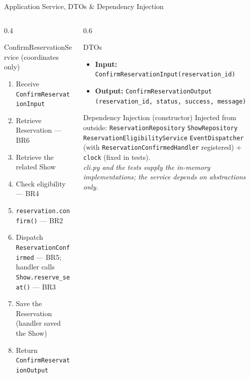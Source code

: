 \documentclass[aspectratio=169,11pt]{beamer}
\newcommand{\code}[1]{\texttt{#1}}
\begin{document}
\begin{frame}{Application Service, DTOs \& Dependency Injection}
  \begin{columns}[t]
    \begin{column}{0.4\textwidth}
      \begin{block}{ConfirmReservationService (coordinates only)}
        \scriptsize
        \begin{enumerate}
          \item Receive \code{ConfirmReservationInput}
          \item Retrieve Reservation --- BR6
          \item Retrieve the related Show
          \item Check eligibility --- BR4
          \item \code{reservation.confirm()} --- BR2
          \item Dispatch \code{ReservationConfirmed} --- BR5; handler calls
                \code{Show.reserve\_seat()} --- BR3
          \item Save the Reservation (handler saved the Show)
          \item Return \code{ConfirmReservationOutput}
        \end{enumerate}
      \end{block}
    \end{column}
    \begin{column}{0.6\textwidth}
      \begin{block}{DTOs}
        \scriptsize
        \begin{itemize}
          \item \textbf{Input:} \code{ConfirmReservationInput(reservation\_id)}
          \item \textbf{Output:} \code{ConfirmReservationOutput}
                \code{(reservation\_id, status, success, message)}
        \end{itemize}
      \end{block}
      \begin{block}{Dependency Injection (constructor)}
        \scriptsize Injected from outside:
        \code{ReservationRepository} \code{ShowRepository}
        \code{ReservationEligibilityService} \code{EventDispatcher}
        (with \code{ReservationConfirmedHandler} registered) +
        \code{clock} (fixed in tests).\\
        {\scriptsize\itshape cli.py and the tests supply the in-memory
        implementations; the service depends on abstractions only.}
      \end{block}
    \end{column}
  \end{columns}
\end{frame}
\end{document}
